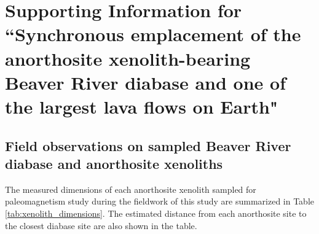 \chapter[Supporting Information for ``Synchronous emplacement of the anorthosite xenolith-bearing Beaver River diabase and one of the largest lava flows on Earth"][Supporting Information-Beaver Bay Complex]{Supporting Information for ``Synchronous emplacement of the anorthosite xenolith-bearing Beaver River diabase and one of the largest lava flows on Earth"}

\section*{Field observations on sampled Beaver River diabase and anorthosite xenoliths}

The measured dimensions of each anorthosite xenolith sampled for paleomagnetism study during the fieldwork of this study are summarized in Table \ref{tab:xenolith_dimensions}. The estimated distance from each anorthosite site to the closest diabase site are also shown in the table.

